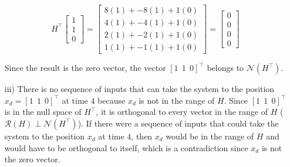 \begin{homeworkProblem}
\begin{solution}
\begin{itemize}
                \[
                    H^\top \left[ \begin{array}{c} 
                        1 \\ 
                        1 \\ 
                        0 \end{array} \right] = 
                    \left[ \begin{array}{c} 
                        8(1) + -8(1) + 1(0) \\ 
                        4(1) + -4(1) + 1(0) \\ 
                        2(1) + -2(1) + 1(0) \\ 
                        1(1) + -1(1) + 1(0) \end{array} \right] = 
                    \left[ \begin{array}{c} 
                        0 \\ 
                        0 \\ 
                        0 \\ 
                        0 \end{array} \right]
                \]

                Since the result is the zero vector, the vector 
                $[ 1 \ \ 1\ \ 0]^\top$ belongs to $\mathcal N(H^\top)$.

            \item[iii)] There is no sequence of inputs that can take the system to the 
                position $x_d=[ 1 \ \ 1\ \ 0]^\top$ at time $4$ because 
                $x_d$ is not in the range of $H$. Since $[ 1 \ \ 1\ \ 0]^\top$ 
                is in the null space of $H^\top$, it is orthogonal to every 
                vector in the range of $H$ ($\mathcal{R}(H) \perp 
                \mathcal{N}(H^\top)$). If there were a sequence of inputs that 
                could take the system to the position $x_d$ at time $4$, then 
                $x_d$ would be in the range of $H$ and would have to be 
                orthogonal to itself, which is a contradiction since $x_d$ is 
                not the zero vector.


\end{itemize}
\end{solution}
\end{homeworkProblem}
